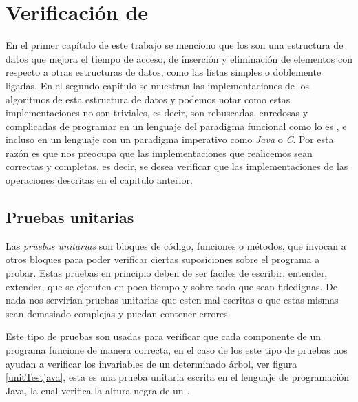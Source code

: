 \chapter{Verificación de {\arns}}

En el primer cap\'itulo de este trabajo se menciono que los {\arns} son una estructura de datos
que mejora el tiempo de acceso, de inserción y eliminación de elementos con respecto a otras
estructuras de datos, como las listas simples o doblemente ligadas. En el segundo cap\'itulo se
muestran las implementaciones de los algoritmos de esta estructura de datos y podemos notar como
estas implementaciones no son triviales, es decir, son rebuscadas, enredosas y complicadas de
programar en un lenguaje del paradigma funcional como lo es {\coq}, e incluso en un lenguaje con un
paradigma imperativo como \textit{Java} o \textit{C}. Por esta razón es que nos preocupa que las
implementaciones que realicemos sean correctas y completas, es decir, se desea verificar que las
implementaciones de las operaciones descritas en el capitulo anterior.

\section{Pruebas unitarias}
Las \textit{pruebas unitarias} \cite{unittest} son bloques de c\'odigo, funciones o m\'etodos, que
invocan a otros bloques para poder verificar ciertas suposiciones sobre el programa a probar. Estas
pruebas en principio deben de ser faciles de escribir, entender, extender, que se ejecuten en poco
tiempo y sobre todo que sean fidedignas. De nada nos servirian pruebas unitarias que esten mal
escritas o que estas mismas sean demasiado complejas y puedan contener errores.

Este tipo de pruebas son usadas para verificar que cada componente de un programa funcione de
manera correcta, en el caso de los {\arns} este tipo de pruebas nos ayudan a verificar los
invariables de un determinado \'arbol, ver figura \ref{unitTestjava}, esta es una prueba unitaria
escrita en el lenguaje de programaci\'on Java, la cual verifica la altura negra de un {\arn}.

